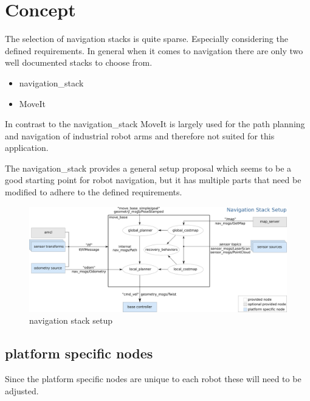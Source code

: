 \chapter{Concept}
\label{Concept}
The selection of navigation stacks is quite sparse. Especially considering the defined requirements. In general when it comes to navigation there are only two well documented stacks to choose from.

\begin{itemize}
	\item navigation\_stack
	\item MoveIt
\end{itemize}

In contrast to the navigation\_stack MoveIt is largely used for the path planning and navigation of industrial robot arms and therefore not suited for this application.

The navigation\_stack provides a general setup proposal which seems to be a good starting point for robot navigation, but it has multiple parts that need be modified to adhere to the defined requirements.\\

\begin{figure}[h!]
	\begin{center}
		\includegraphics[width=\textwidth]{Pictures/navigation stack setup}
		\caption[navigation stack setup]{navigation stack setup}
		
	\end{center}
\end{figure}





\section{platform specific nodes}
Since the platform specific nodes are unique to each robot these will need to be adjusted.\\
